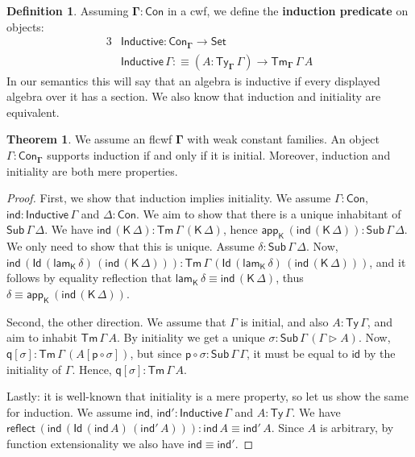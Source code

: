 \documentclass[12pt,a4paper,twoside,openany]{book}
\theoremstyle{remark}
\theoremstyle{definition}
\newtheorem{mydefinition}{Definition}
\theoremstyle{theorem}
\newtheorem{theorem}{Theorem}
\newcommand{\ms}[1]{\mathsf{#1}}
\newcommand{\bs}[1]{\boldsymbol{#1}}
\newcommand{\reflect}{\mathsf{reflect}}
\newcommand{\id}{\mathsf{id}}
\newcommand{\Con}{\mathsf{Con}}
\newcommand{\Sub}{\mathsf{Sub}}
\newcommand{\Tm}{\mathsf{Tm}}
\newcommand{\Ty}{\mathsf{Ty}}
\newcommand{\Id}{\mathsf{Id}}
\newcommand{\ra}{\rightarrow}
\newcommand{\Set}{\mathsf{Set}}
\newcommand{\ext}{\triangleright}
\newcommand{\lamK}{\mathsf{lam}_{\K}}
\newcommand{\appK}{\mathsf{app}_{\K}}
\newcommand{\p}{\mathsf{p}}
\newcommand{\q}{\mathsf{q}}
\newcommand{\K}{\mathsf{K}}
\newcommand{\bCon}{\bs{\Con}}
\newcommand{\bGamma}{\bs{\Gamma}}
\newcommand{\Inductive}{\ms{Inductive}}
\newcommand{\defn}{:\equiv}
\begin{document}
\begin{mydefinition}
\label{def:induction-predicate}
Assuming $\bGamma : \bCon$ in a cwf, we define the \textbf{induction predicate} on
objects:
\begin{alignat*}{3}
  & \Inductive : \Con_{\bGamma} \to \Set\\
  & \Inductive\,\Gamma \defn (A : \Ty_{\bGamma}\,\Gamma)\ra \Tm_{\bGamma}\,\Gamma\,A
\end{alignat*}
In our semantics this will say that an algebra is inductive if every displayed
algebra over it has a section. We also know that induction and initiality are
equivalent.
\end{mydefinition}

\begin{theorem}\label{thm:initiality-induction}
We assume an flcwf $\bGamma$ with weak constant families.
An object $\Gamma : \Con_{\bGamma}$ supports induction if
and only if it is initial. Moreover, induction and initiality are both mere
properties.
\end{theorem}

\begin{proof}
First, we show that induction implies initiality. We assume $\Gamma : \Con$,
$\ms{ind} : \ms{Inductive}\,\Gamma$ and $\Delta : \Con$. We aim to show that
there is a unique inhabitant of $\Sub\,\Gamma\,\Delta$. We have
$\ms{ind}\,(\K\,\Delta) : \Tm\,\Gamma\,(\K\,\Delta)$, hence
$\appK\,(\ms{ind}\,(\K\,\Delta)) : \Sub\,\Gamma\,\Delta$. We only need to show that this
is unique.  Assume $\delta : \Sub\,\Gamma\,\Delta$. Now,
$\ms{ind}\,(\Id\,(\lamK\,\delta)\,(\ms{ind}\,(\K\,\Delta))) :
\Tm\,\Gamma\,(\Id\,(\lamK\,\delta)\,(\ms{ind}\,(\K\,\Delta)))$, and it follows by
equality reflection that $\lamK\,\delta \equiv \ms{ind}\,(\K\,\Delta)$, thus
$\delta \equiv \appK\,(\ms{ind}\,(\K\,\Delta))$.

Second, the other direction. We assume that $\Gamma$ is initial, and also $A :
\Ty\,\Gamma$, and aim to inhabit $\Tm\,\Gamma\,A$. By initiality we get a unique
$\sigma : \Sub\,\Gamma\,(\Gamma \ext A)$. Now, $\q[\sigma] : \Tm\,\Gamma\,(A[\p \circ \sigma])$,
but since $\p \circ \sigma : \Sub\,\Gamma\,\Gamma$, it must be equal to $\id$ by the initiality
of $\Gamma$. Hence, $\q[\sigma] : \Tm\,\Gamma\,A$.

Lastly: it is well-known that initiality is a mere property, so let us show the
same for induction.  We assume $\ms{ind},\,\ms{ind'} : \ms{Inductive}\,\Gamma$
and $A : \Ty\,\Gamma$. We have
$\reflect\,(\ms{ind}\,(\Id\,(\ms{ind}\,A)\,(\ms{ind'}\,A))) : \ms{ind}\,A \equiv
\ms{ind'}\,A$. Since $A$ is arbitrary, by function extensionality we also have $\ms{ind} \equiv \ms{ind'}$.
\end{proof}
\end{document}
